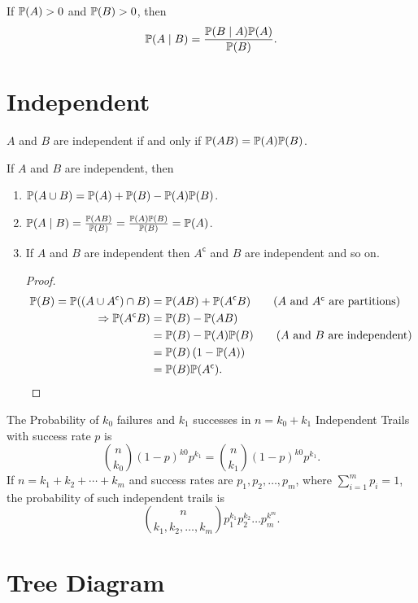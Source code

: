 \begin{theorem}
    If $\P{A}>0$ and $\P{B}>0$, then
    \begin{equation*}
        \condP{A}{B} = \frac{\condP{B}{A}\P{A}}{\P{B}}.
    \end{equation*}
\end{theorem}

\section{Independent}
\begin{definition}
    [Independent]
    $A$ and $B$ are independent if and only if $\P{AB}=\P{A}\P{B}$.
\end{definition}

\begin{theorem}
    If $A$ and $B$ are independent, then
    \begin{enumerate}
        \item $\P{A \cup B} = \P{A}+\P{B}-\P{A}\P{B}$.
        \item $\condP{A}{B} = \frac{\P{AB}}{\P{B}}=\frac{\P{A}\P{B}}{\P{B}}=\P{A}$. \label{item:independent}
        \item If $A$ and $B$ are independent then $A^{\mathsf{c}}$ and $B$ are independent and so on.{
            \begin{proof}
                \begin{align*}
                    \P{B} = \P{(A\cup A^{\mathsf{c}})\cap B}
                    &= \P{AB}+\P{A^{\mathsf{c}}B}  \tag{$A$ and $A^\mathsf{c}$ are partitions}\\
                    \Rightarrow \P{A^{\mathsf{c}}B}
                    &= \P{B}-\P{AB} \\
                    &= \P{B}-\P{A}\P{B}  \tag{$A$ and $B$ are independent}\\
                    &= \P{B}\left(1-\P{A}\right) \\
                    &= \P{B}\P{A^{\mathsf{c}}}.
                \end{align*}
            \end{proof}
        }
    \end{enumerate}
\end{theorem}

\begin{theorem}
    The Probability of $k_0$ failures and $k_1$ successes in $n=k_0+k_1$ Independent Trails with success rate $p$ is \[\binom{n}{k_0}(1-p)^{k0}p^{k_1}=\binom{n}{k_1}(1-p)^{k0}p^{k_1}.\]
    If $n=k_1+k_2+\cdots+k_m$ and success rates are $p_1, p_2,\ldots,p_m$, where $\sum_{i=1}^{m}p_i=1$, the probability of such independent trails is
    \[\binom{n}{k_1,k_2,\ldots,k_m}p_1^{k_1}p_2^{k_2}\ldots p_m^{k^m}.\]
\end{theorem}

\section{Tree Diagram}